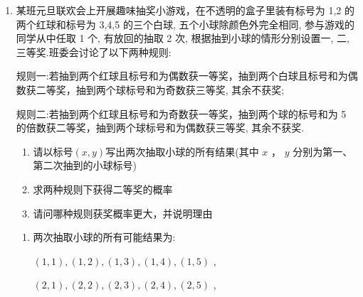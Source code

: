 \begin{enumerate}
\begin{enumerate}
\begin{jieda}
\begin{enumerate}
                因此, $P = \dfrac{7}{10}$ ,即选出的 2 人不全是男生的概率为 $\dfrac{7}{10}$
                \item {}
            \end{enumerate}
        \end{jieda}
        \item 某班元旦联欢会上开展趣味抽奖小游戏，在不透明的盒子里装有标号为 1,2 的两个红球和标号为 3,4,5 的三个白球, 五个小球除颜色外完全相同, 参与游戏的同学从中任取 1 个, 有放回的抽取 2 次, 根据抽到小球的情形分别设置一, 二, 三等奖.班委会讨论了以下两种规则:
        
        规则一:若抽到两个红球且标号和为偶数获一等奖，抽到两个白球且标号和为偶数获二等奖，抽到两个球标号和为奇数获三等奖, 其余不获奖;
        
        规则二:若抽到两个红球且标号和为奇数获一等奖，抽到两个球的标号和为 5 的倍数获二等奖，抽到两个球标号和为偶数获三等奖, 其余不获奖.

        \begin{enumerate}
            \item 请以标号$(x,y)$写出两次抽取小球的所有结果(其中 $x$ ， $y$ 分别为第一、第二次抽到的小球标号)
            \item 求两种规则下获得二等奖的概率
            \item 请问哪种规则获奖概率更大，并说明理由
        \end{enumerate}
        \begin{jieda}
            \begin{enumerate}
                \item 两次抽取小球的所有可能结果为:
                
                $\left( {1,1}\right) ,\left( {1,2}\right) ,\left( {1,3}\right) ,\left( {1,4}\right) ,\left( {1,5}\right)$ ,
                
                $\left( {2,1}\right) ,\left( {2,2}\right) ,\left( {2,3}\right) ,\left( {2,4}\right) ,\left( {2,5}\right)$ ,
                

\end{enumerate}
\end{jieda}
\end{enumerate}
\end{enumerate}

